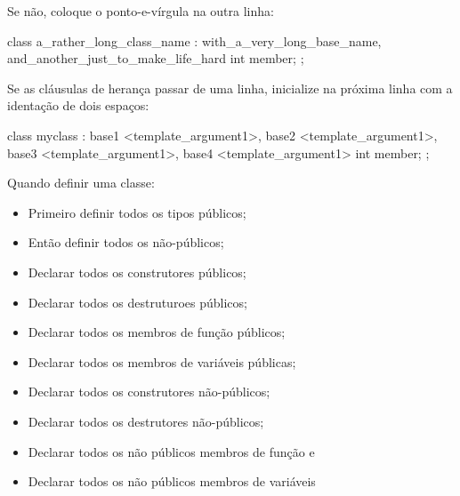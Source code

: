 \documentclass{article}
\begin{document}
\begin{code}
class myclass : base {
\end{code}

Se não, coloque o ponto-e-vírgula na outra linha:

\begin{code}
class a_rather_long_class_name 
: with_a_very_long_base_name, and_another_just_to_make_life_hard
{ 
  int member; 
};
\end{code}

Se as cláusulas de herança passar de uma linha, inicialize na próxima linha com a identação de dois espaços:
\begin{code}
class myclass 
: base1 <template_argument1>, base2 <template_argument1>,
  base3 <template_argument1>, base4 <template_argument1>
{ 
  int member; 
};
\end{code}

Quando definir uma classe:

\begin{itemize}
\item Primeiro definir todos os tipos públicos;
\item Então definir todos os não-públicos;
\item Declarar todos os construtores públicos;
\item Declarar todos os destruturoes públicos;
\item Declarar todos os membros de função públicos;
\item Declarar todos os membros de variáveis públicas;
\item Declarar todos os construtores não-públicos;
\item Declarar todos os destrutores não-públicos;
\item Declarar todos os não públicos membros de função e
\item Declarar todos os não públicos membros de variáveis
\end{itemize}



\end{document}
